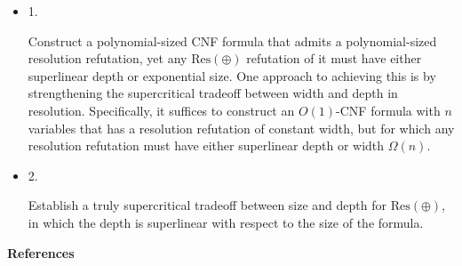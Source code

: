 \begin{itemize}


\item 
1. 


Construct a polynomial-sized CNF formula that admits a polynomial-sized resolution
refutation, yet any $\mathrm{Res}(\oplus)$ refutation of it must have either superlinear depth or exponential size.
One approach to achieving this is by strengthening the supercritical tradeoff
between width and depth in resolution. Specifically, it suffices to construct an $O(1)$-CNF
formula with $n$ variables that has a resolution refutation of constant width,
but for which any resolution refutation must have either superlinear depth or width $\Omega(n)$.\par





\item 
2. 


Establish a truly supercritical tradeoff between size and depth for $\mathrm{Res}(\oplus)$,
in which the depth is superlinear with respect to the size of the formula.\par





\end{itemize}


\par\medskip\noindent\textbf{References}\par

